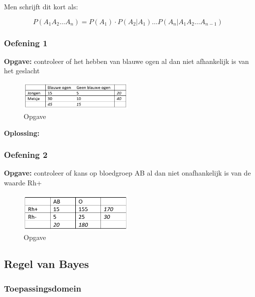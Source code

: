 \documentclass{article}
\begin{document}
Men schrijft dit kort als:

\begin{equation}
    P(A_1 A_2 \dots A_n) = P(A_1) \cdot P(A_2 | A_1) \dots P(A_n | A_1 A_2 \dots A_{n-1})
\end{equation}

\subsubsection{Oefening 1}

\textbf{Opgave:} controleer of het hebben van blauwe ogen al dan niet afhankelijk is van het geslacht

\begin{figure}[H]
    \centering
    \includegraphics[width=0.5\textwidth]{vkans-productregel-oef.png}
    \caption{Opgave}
\end{figure}

\textbf{Oplossing:}



\subsubsection{Oefening 2}

\textbf{Opgave:} controleer of kans op bloedgroep AB al dan niet onafhankelijk is van de waarde Rh+

\begin{figure}[H]
    \centering
    \includegraphics[width=0.5\textwidth]{vkans-productregel-oef2.png}
    \caption{Opgave}
\end{figure}

\subsection{Regel van Bayes}

\subsubsection{Toepassingsdomein}
\end{document}
